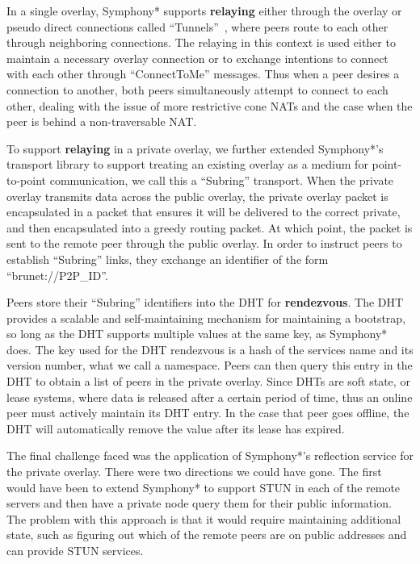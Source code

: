 \documentclass[conference]{IEEEtran}
\begin{document}
In a single overlay, Symphony* supports \textbf{relaying} either through the
overlay or pseudo direct connections called ``Tunnels''~\cite{hpdc08_0}, where
peers route to each other through neighboring connections.  The relaying in
this context is used either to maintain a necessary overlay connection or to
exchange intentions to connect with each other through ``ConnectToMe''
messages.  Thus when a peer desires a connection to another, both peers
simultaneously attempt to connect to each other, dealing with the issue of more
restrictive cone NATs and the case when the peer is behind a non-traversable
NAT.  

To support \textbf{relaying} in a private overlay, we further extended Symphony*'s
transport library to support treating an existing overlay as a medium for
point-to-point communication, we call this a ``Subring'' transport.  When the
private overlay transmits data across the public overlay, the private overlay
packet is encapsulated in a packet that ensures it will be delivered to the
correct private, and then encapsulated into a greedy routing packet.  At which
point, the packet is sent to the remote peer through the public overlay.  In
order to instruct peers to establish ``Subring'' links, they exchange an
identifier of the form ``brunet://P2P\_ID''.

Peers store their ``Subring'' identifiers into the DHT for \textbf{rendezvous}.
The DHT provides a scalable and self-maintaining mechanism for maintaining a
bootstrap, so long as the DHT supports multiple values at the same key, as
Symphony* does.  The key used for the DHT rendezvous is a hash of the services
name and its version number, what we call a namespace.  Peers can then query
this entry in the DHT to obtain a list of peers in the private overlay.  Since
DHTs are soft state, or lease systems, where data is released after a certain
period of time, thus an online peer must actively maintain its DHT entry.  In
the case that peer goes offline, the DHT will automatically remove the value
after its lease has expired.

The final challenge faced was the application of Symphony*'s reflection service
for the private overlay.  There were two directions we could have gone.  The
first would have been to extend Symphony* to support STUN in each of the remote
servers and then have a private node query them for their public information.
The problem with this approach is that it would require maintaining additional
state, such as figuring out which of the remote peers are on public addresses
and can provide STUN services.
\end{document}
